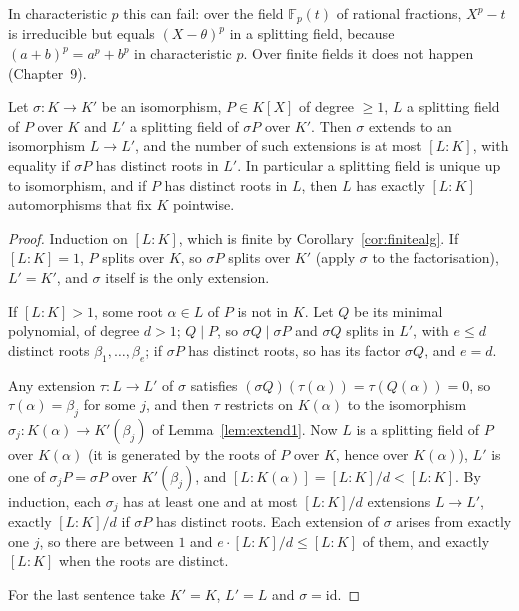 \begin{remark}
In characteristic $p$ this can fail: over the field $\mathbb F_p(t)$ of rational fractions, $X^p-t$ is irreducible but equals $(X-\theta)^p$ in a splitting field, because $(a+b)^p=a^p+b^p$ in characteristic $p$. Over finite fields it does not happen (Chapter~9).
\end{remark}

\begin{theorem}\label{thm:splitunique}
Let $\sigma:K\to K'$ be an isomorphism, $P\in K[X]$ of degree $\ge1$, $L$ a splitting field of $P$ over $K$ and $L'$ a splitting field of $\sigma P$ over $K'$. Then $\sigma$ extends to an isomorphism $L\to L'$, and the number of such extensions is at most $[L:K]$, with equality if $\sigma P$ has distinct roots in $L'$.
In particular a splitting field is unique up to isomorphism, and if $P$ has distinct roots in $L$, then $L$ has exactly $[L:K]$ automorphisms that fix $K$ pointwise.
\end{theorem}
\begin{proof}
Induction on $[L:K]$, which is finite by Corollary~\ref{cor:finitealg}. If $[L:K]=1$, $P$ splits over $K$, so $\sigma P$ splits over $K'$ (apply $\sigma$ to the factorisation), $L'=K'$, and $\sigma$ itself is the only extension.

If $[L:K]>1$, some root $\alpha\in L$ of $P$ is not in $K$. Let $Q$ be its minimal polynomial, of degree $d>1$; $Q\mid P$, so $\sigma Q\mid\sigma P$ and $\sigma Q$ splits in $L'$, with $e\le d$ distinct roots $\beta_1,\dots,\beta_e$; if $\sigma P$ has distinct roots, so has its factor $\sigma Q$, and $e=d$.

Any extension $\tau:L\to L'$ of $\sigma$ satisfies $(\sigma Q)(\tau(\alpha))=\tau(Q(\alpha))=0$, so $\tau(\alpha)=\beta_j$ for some $j$, and then $\tau$ restricts on $K(\alpha)$ to the isomorphism $\sigma_j:K(\alpha)\to K'(\beta_j)$ of Lemma~\ref{lem:extend1}. Now $L$ is a splitting field of $P$ over $K(\alpha)$ (it is generated by the roots of $P$ over $K$, hence over $K(\alpha)$), $L'$ is one of $\sigma_jP=\sigma P$ over $K'(\beta_j)$, and $[L:K(\alpha)]=[L:K]/d<[L:K]$. By induction, each $\sigma_j$ has at least one and at most $[L:K]/d$ extensions $L\to L'$, exactly $[L:K]/d$ if $\sigma P$ has distinct roots. Each extension of $\sigma$ arises from exactly one $j$, so there are between $1$ and $e\cdot[L:K]/d\le[L:K]$ of them, and exactly $[L:K]$ when the roots are distinct.

For the last sentence take $K'=K$, $L'=L$ and $\sigma=\mathrm{id}$.
\end{proof}

